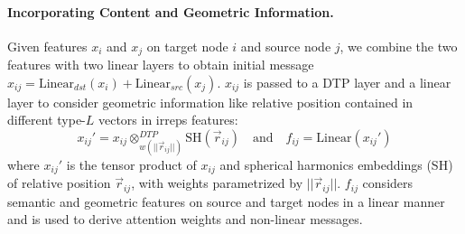 \paragraph{Incorporating Content and Geometric Information.}
Given features $x_i$ and $x_j$ on target node $i$ and source node $j$, we combine the two features with two linear layers to obtain initial message $x_{ij} = \text{Linear}_{dst} (x_i) + \text{Linear}_{src}(x_j)$.
$x_{ij}$ is passed to a DTP layer and a linear layer to consider geometric information like relative position contained in different type-$L$ vectors in irreps features: 
\begin{equation}
x_{ij}' = x_{ij} \otimes_{w(||\vec{r}_{ij}||)}^{DTP} \text{SH}(\vec{r}_{ij}) 
\quad\text{and}\quad
f_{ij} = \text{Linear}(x_{ij}')
\label{eq:pre_attn}
\end{equation}
where $x_{ij}'$ is the tensor product of $x_{ij}$ and spherical harmonics embeddings (SH) of relative position $\vec{r}_{ij}$, with weights parametrized by $||\vec{r}_{ij}||$.
$f_{ij}$ considers semantic and geometric features on source and target nodes in a linear manner and is used to derive attention weights and non-linear messages.

\vspace{-2.25mm}
